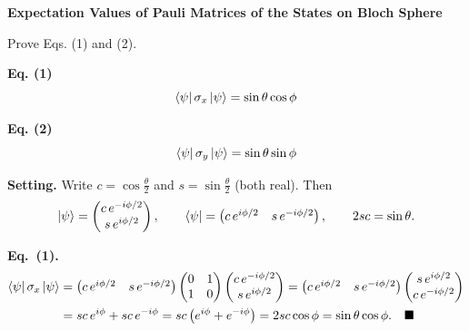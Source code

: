 \documentclass[a4paper, 10pt]{article}
\begin{document}
\begin{problem}
\textbf{Expectation Values of Pauli Matrices of the States on Bloch Sphere}
\par Prove Eqs. (1) and (2).
\par\noindent\textbf{Eq. (1)}
\[ \bra{\psi} \sigma_x \ket{\psi} = \sin\theta \cos\phi \]

\par\noindent\textbf{Eq. (2)}
\[ \bra{\psi} \sigma_y \ket{\psi} = \sin\theta \sin\phi \]
\end{problem}

\begin{solution}
	\noindent \textbf{Setting.} Write \( c = \cos\tfrac{\theta}{2} \) and \( s = \sin\tfrac{\theta}{2} \) (both real). Then
	\[
		\ket{\psi} = \begin{pmatrix} c\,e^{-i\phi/2} \\ s\,e^{i\phi/2} \end{pmatrix}, \qquad
		\bra{\psi} = \begin{pmatrix} c\,e^{i\phi/2} & s\,e^{-i\phi/2} \end{pmatrix}, \qquad
		2sc = \sin\theta .
	\]

	\myspace

	\noindent \textbf{Eq.~(1).}
	\begin{align*}
		\bra{\psi}\sigma_x\ket{\psi}
		 & = \begin{pmatrix} c\,e^{i\phi/2} & s\,e^{-i\phi/2} \end{pmatrix}\begin{pmatrix} 0 & 1 \\ 1 & 0 \end{pmatrix}\begin{pmatrix} c\,e^{-i\phi/2} \\ s\,e^{i\phi/2} \end{pmatrix}
		= \begin{pmatrix} c\,e^{i\phi/2} & s\,e^{-i\phi/2} \end{pmatrix}\begin{pmatrix} s\,e^{i\phi/2} \\ c\,e^{-i\phi/2} \end{pmatrix} \\
		 & = sc\,e^{i\phi} + sc\,e^{-i\phi} = sc\left(e^{i\phi} + e^{-i\phi}\right) = 2sc\cos\phi = \sin\theta\cos\phi. \quad \blacksquare
	\end{align*}


\end{solution}
\end{document}
